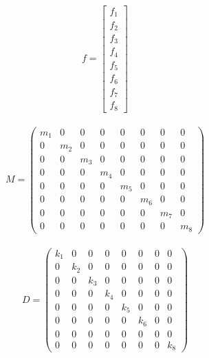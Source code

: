 \begin{eqnarray}
    f = 
    \left[\begin{matrix}
        f_1 \\
        f_2 \\
        f_3 \\
        f_4 \\
        f_5 \\
        f_6 \\
        f_7 \\
        f_8
    \end{matrix}\right]
\end{eqnarray}

\begin{eqnarray}
    M = 
    \left(\begin{matrix}
        m_1 & 0   & 0   & 0   & 0   & 0   & 0   & 0   \\
        0   & m_2 & 0   & 0   & 0   & 0   & 0   & 0   \\
        0   & 0   & m_3 & 0   & 0   & 0   & 0   & 0   \\
        0   & 0   & 0   & m_4 & 0   & 0   & 0   & 0   \\
        0   & 0   & 0   & 0   & m_5 & 0   & 0   & 0   \\
        0   & 0   & 0   & 0   & 0   & m_6 & 0   & 0   \\
        0   & 0   & 0   & 0   & 0   & 0   & m_7 & 0   \\
        0   & 0   & 0   & 0   & 0   & 0   & 0   & m_8  
    \end{matrix}\right)
\end{eqnarray}

\begin{eqnarray}
    D =
    \left(\begin{matrix}
        k_1 & 0   & 0   & 0   & 0   & 0   & 0   & 0   \\
        0   & k_2 & 0   & 0   & 0   & 0   & 0   & 0   \\
        0   & 0   & k_3 & 0   & 0   & 0   & 0   & 0   \\
        0   & 0   & 0   & k_4 & 0   & 0   & 0   & 0   \\
        0   & 0   & 0   & 0   & k_5 & 0   & 0   & 0   \\
        0   & 0   & 0   & 0   & 0   & k_6 & 0   & 0   \\
        0   & 0   & 0   & 0   & 0   & 0   & 0   & 0   \\
        0   & 0   & 0   & 0   & 0   & 0   & 0   & k_8
    \end{matrix}\right)
\end{eqnarray}

